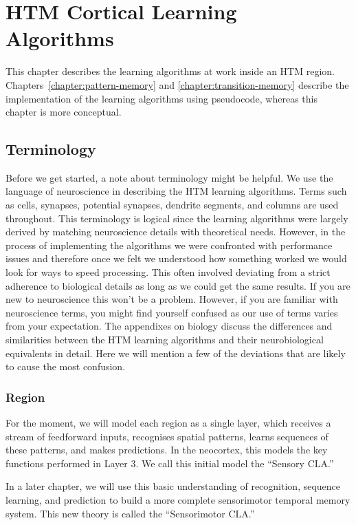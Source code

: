 \chapter{HTM Cortical Learning Algorithms}
\label{chapter:learning}

This chapter describes the learning algorithms at work inside an HTM
region. Chapters~\ref{chapter:pattern-memory} and
\ref{chapter:transition-memory} describe the implementation of the
learning algorithms using pseudocode, whereas this chapter is more
conceptual.

\section*{Terminology}

Before we get started, a note about terminology might be helpful. We
use the language of neuroscience in describing the HTM learning
algorithms. Terms such as cells, synapses, potential synapses,
dendrite segments, and columns are used throughout. This terminology
is logical since the learning algorithms were largely derived by
matching neuroscience details with theoretical needs. However, in the
process of implementing the algorithms we were confronted with
performance issues and therefore once we felt we understood how
something worked we would look for ways to speed processing. This
often involved deviating from a strict adherence to biological details
as long as we could get the same results. If you are new to
neuroscience this won't be a problem. However, if you are familiar
with neuroscience terms, you might find yourself confused as our use
of terms varies from your expectation. The appendixes on biology
discuss the differences and similarities between the HTM learning
algorithms and their neurobiological equivalents in detail. Here we
will mention a few of the deviations that are likely to cause the most
confusion.

\subsection*{Region}

For the moment, we will model each region as a single layer, which receives 
a stream of feedforward inputs, recognises spatial patterns, learns sequences
of these patterns, and makes predictions. In the neocortex, this models the key functions performed 
in Layer 3. We call this initial model the ``Sensory CLA.''

In a later chapter, we will use this basic understanding of recognition, sequence learning, and prediction
to build a more complete sensorimotor temporal memory system. This new theory is called the ``Sensorimotor
CLA.''

